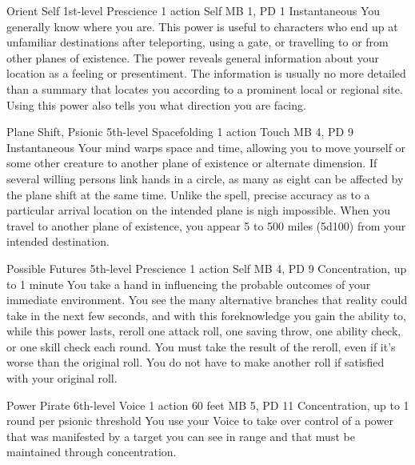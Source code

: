 \DndPowerHeader%
  {Orient Self}
  {1st-level Prescience}
  {1 action}
  {Self}
  {MB 1, PD 1}
  {Instantaneous}
You generally know where you are.
This power is useful to characters who end up at unfamiliar destinations
after teleporting,
using a gate,
or travelling to or from other planes of existence.
The power reveals general information about your location
as a feeling or presentiment.
The information is usually no more detailed than a summary
that locates you according to a prominent local or regional site.
Using this power also tells you what direction you are facing.

\DndPowerHeader%
  {Plane Shift, Psionic}
  {5th-level Spacefolding}
  {1 action}
  {Touch}
  {MB 4, PD 9}
  {Instantaneous}
  Your mind warps space and time,
  allowing you to move yourself
  or some other creature to another plane of existence
  or alternate dimension.
  If several willing persons link hands in a circle,
  as many as eight can be affected by the plane shift at the same time.
  Unlike the  spell,
  precise accuracy as to a particular arrival location
  on the intended plane is nigh impossible.
  When you travel to another plane of existence,
  you appear 5 to 500 miles (5d100) from your intended destination.

\DndPowerHeader%
  {Possible Futures}
  {5th-level Prescience}
  {1 action}
  {Self}
  {MB 4, PD 9}
  {Concentration, up to 1 minute}
  You take a hand in influencing the probable outcomes
  of your immediate environment.
  You see the many alternative branches that reality could take
  in the next few seconds,
  and with this foreknowledge you gain the ability to,
  while this power lasts,
  reroll one attack roll,
  one saving throw,
  one ability check,
  or one skill check each round.
  You must take the result of the reroll,
  even if it's worse than the original roll.
  You do not have to make another roll
  if satisfied with your original roll.

\DndPowerHeader%
  {Power Pirate}
  {6th-level Voice}
  {1 action}
  {60 feet}
  {MB 5, PD 11}
  {Concentration, up to 1 round per psionic threshold}
  You use your Voice to take over control of a power
  that was manifested by a target you can see in range
  and that must be maintained through concentration.

